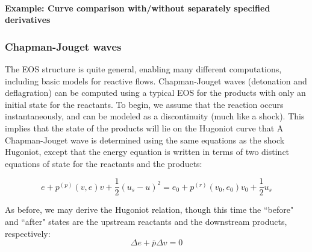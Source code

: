 \documentclass[twocolumn,10pt]{asme2ej}
\begin{document}
\paragraph{Example: Curve comparison with/without separately specified derivatives}

\subsubsection{Chapman-Jouget waves}
The EOS structure is quite general, enabling many different computations, including basic models for reactive flows. Chapman-Jouget waves (detonation and deflagration) can be computed using a typical EOS for the products with only an initial state for the reactants. 
To begin, we assume that the reaction occurs instantaneously, and can be modeled as a discontinuity (much like a shock). This implies that the state of the products will lie on the Hugoniot curve that 
A Chapman-Jouget wave is determined using the same equations as the shock Hugoniot, except that the energy equation is written in terms of two distinct equations of state for the reactants and the products: 

\[e + {p^{\left( p \right)}}\left( {v,e} \right)v + \frac{1}{2}{\left( {{u_s} - u} \right)^2} = {e_0} + {p^{\left( r \right)}}\left( {{v_0},{e_0}} \right){v_0} + \frac{1}{2}{u_s}\]

As before, we may derive the Hugoniot relation, though this time the ``before" and ``after" states are the upstream reactants and the downstream products, respectively:
\[\Delta e + \bar p\Delta v = 0\]
\end{document}
